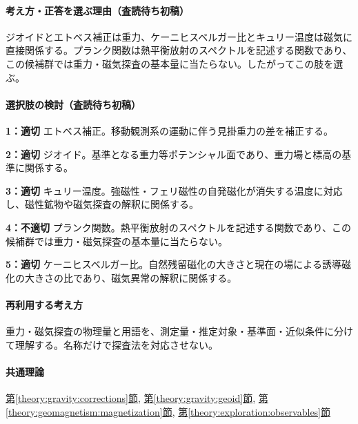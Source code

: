 \paragraph{考え方・正答を選ぶ理由（査読待ち初稿）} ジオイドとエトベス補正は重力、ケーニヒスベルガー比とキュリー温度は磁気に直接関係する。プランク関数は熱平衡放射のスペクトルを記述する関数であり、この候補群では重力・磁気探査の基本量に当たらない。したがってこの肢を選ぶ。

\paragraph{選択肢の検討（査読待ち初稿）}\mbox{}\par

\noindent\textbf{1：適切} エトベス補正。移動観測系の運動に伴う見掛重力の差を補正する。\par

\noindent\textbf{2：適切} ジオイド。基準となる重力等ポテンシャル面であり、重力場と標高の基準に関係する。\par

\noindent\textbf{3：適切} キュリー温度。強磁性・フェリ磁性の自発磁化が消失する温度に対応し、磁性鉱物や磁気探査の解釈に関係する。\par

\noindent\textbf{4：不適切} プランク関数。熱平衡放射のスペクトルを記述する関数であり、この候補群では重力・磁気探査の基本量に当たらない。\par

\noindent\textbf{5：適切} ケーニヒスベルガー比。自然残留磁化の大きさと現在の場による誘導磁化の大きさの比であり、磁気異常の解釈に関係する。\par

\paragraph{再利用する考え方} 重力・磁気探査の物理量と用語を、測定量・推定対象・基準面・近似条件に分けて理解する。名称だけで探査法を対応させない。

\paragraph{共通理論} \hyperref[theory:gravity:corrections]{第\ref*{theory:gravity:corrections}節}, \hyperref[theory:gravity:geoid]{第\ref*{theory:gravity:geoid}節}, \hyperref[theory:geomagnetism:magnetization]{第\ref*{theory:geomagnetism:magnetization}節}, \hyperref[theory:exploration:observables]{第\ref*{theory:exploration:observables}節}

